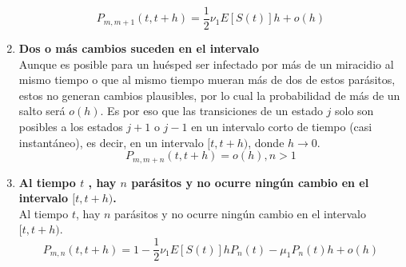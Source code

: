 \begin{enumerate}
        $$P_{m,m+1}(t,t+h)=\frac{1}{2}\nu_1E[S(t)]h+o(h)$$
        \item \textbf{Dos o más cambios suceden en el intervalo} \\Aunque es posible para un huésped ser infectado por más de un miracidio al mismo tiempo o que al mismo tiempo mueran más de dos de estos parásitos, estos no generan cambios plausibles, por lo cual la probabilidad de más de un salto será $o(h)$. Es por eso que las transiciones de un estado $j$ solo son posibles a los estados $j+1$ o $j-1$ en un intervalo corto de tiempo (casi instantáneo), es decir, en un intervalo $[t,t+h)$, donde $h\rightarrow 0$.
        $$P_{m,m+n}(t,t+h)=o(h), n>1$$
        \item
        \textbf{Al tiempo $t$ , hay $n$ parásitos y no ocurre ningún cambio en el intervalo $[t,t+h)$.}\\
        Al tiempo $t$, hay $n$ parásitos y no ocurre ningún cambio en el intervalo $[t,t+h)$.
         $$P_{m,n}(t,t+h)= 1-\frac{1}{2}\nu_1E[S(t)]hP_n(t)-\mu_1 P_{n}(t)h+o(h)$$
    \end{enumerate}
